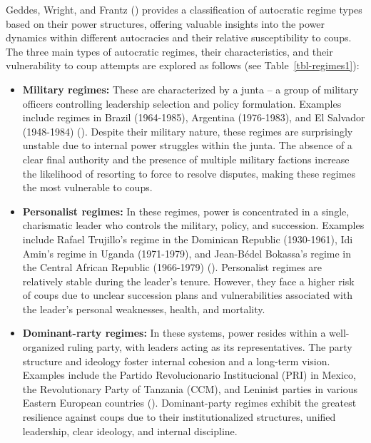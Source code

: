 \documentclass[
  12pt,
]{report}
\begin{document}
Geddes, Wright, and Frantz () provides a
classification of autocratic regime types based on their power
structures, offering valuable insights into the power dynamics within
different autocracies and their relative susceptibility to coups. The
three main types of autocratic regimes, their characteristics, and their
vulnerability to coup attempts are explored as follows (see
Table~\ref{tbl-regimes1}):

\begin{itemize}
\item
  \textbf{Military regimes:} These are characterized by a junta -- a
  group of military officers controlling leadership selection and policy
  formulation. Examples include regimes in Brazil (1964-1985), Argentina
  (1976-1983), and El Salvador (1948-1984)
  (). Despite their military
  nature, these regimes are surprisingly unstable due to internal power
  struggles within the junta. The absence of a clear final authority and
  the presence of multiple military factions increase the likelihood of
  resorting to force to resolve disputes, making these regimes the most
  vulnerable to coups.
\item
  \textbf{Personalist regimes:} In these regimes, power is concentrated
  in a single, charismatic leader who controls the military, policy, and
  succession. Examples include Rafael Trujillo's regime in the Dominican
  Republic (1930-1961), Idi Amin's regime in Uganda (1971-1979), and
  Jean-Bédel Bokassa's regime in the Central African Republic
  (1966-1979) (). Personalist
  regimes are relatively stable during the leader's tenure. However,
  they face a higher risk of coups due to unclear succession plans and
  vulnerabilities associated with the leader's personal weaknesses,
  health, and mortality.
\item
  \textbf{Dominant-rarty regimes:} In these systems, power resides
  within a well-organized ruling party, with leaders acting as its
  representatives. The party structure and ideology foster internal
  cohesion and a long-term vision. Examples include the Partido
  Revolucionario Institucional (PRI) in Mexico, the Revolutionary Party
  of Tanzania (CCM), and Leninist parties in various Eastern European
  countries (). Dominant-party
  regimes exhibit the greatest resilience against coups due to their
  institutionalized structures, unified leadership, clear ideology, and
  internal discipline.
\end{itemize}
\end{document}

